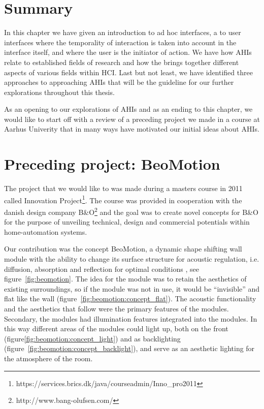 \section{Summary}

In this chapter we have given an introduction to ad hoc interfaces, a  to user interfaces where the temporality of interaction is taken into account in the interface itself, and where the user is the initiator of action.
We have  how AHIs relate to established fields of research and how the  brings together different aspects of various fields within HCI.
Last but not least, we have identified three approaches to approaching AHIs that will be the guideline for our further explorations throughout this thesis.

As an opening to our explorations of AHIs and as an ending to this chapter, we would like to start off with a review of a preceding project we made in a course at Aarhus Univerity that in many ways have motivated our initial ideas about AHIs.

\section{Preceding project: BeoMotion}

The project that we would like to  was made during a masters course in 2011 called Innovation Project\footnote{https://services.brics.dk/java/courseadmin/Inno\_pro2011}.
The course was provided in cooperation with the danish design company B\&O\footnote{http://www.bang-olufsen.com/} and the goal was to create novel concepts for B\&O for the purpose of unveiling technical, design and commercial potentials within home-automation systems.

Our contribution was the concept BeoMotion, a dynamic shape shifting wall module with the ability to change its surface structure for acoustic regulation, i.e. diffusion, absorption and reflection for optimal conditions \cite{beomotionreportstefan, beomotionreporttore}, see figure~\ref{fig:beomotion}.
The idea for the module was to retain the aesthetics of existing surroundings, so if the module was not in use, it would be ``invisible'' and flat like the wall (figure~\ref{fig:beomotion:concept_flat}).  
The acoustic functionality and the aesthetics that follow were the primary features of the modules.
Secondary, the modules had illumination features integrated into the modules.
In this way different areas of the modules could light up, both on the front (figure\ref{fig:beomotion:concept_light}) and as backlighting (figure~\ref{fig:beomotion:concept_backlight}), and serve as an aesthetic lighting for the atmosphere of the room.

